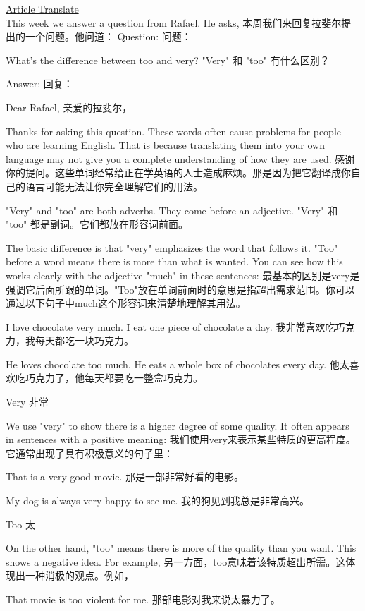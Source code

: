 \href{https://www.51voa.com/VOA_Special_English/very-and-too-84302_1.html}{Article Translate} \\

This week we answer a question from Rafael.  He asks,
本周我们来回复拉斐尔提出的一个问题。他问道：
Question:
问题：

What's the difference between too and very?
"Very" 和 "too" 有什么区别？

Answer:
回复：

Dear Rafael,
亲爱的拉斐尔，

Thanks for asking this question. These words often cause problems for people who are learning English. That is because translating them into your own language may not give you a complete understanding of how they are used.
感谢你的提问。这些单词经常给正在学英语的人士造成麻烦。那是因为把它翻译成你自己的语言可能无法让你完全理解它们的用法。

"Very" and "too" are both adverbs. They come before an adjective.
"Very" 和 "too" 都是副词。它们都放在形容词前面。

The basic difference is that "very" emphasizes the word that follows it. "Too" before a word means there is more than what is wanted. You can see how this works clearly with the adjective "much" in these sentences:
最基本的区别是very是强调它后面所跟的单词。"Too"放在单词前面时的意思是指超出需求范围。你可以通过以下句子中much这个形容词来清楚地理解其用法。

I love chocolate very much. I eat one piece of chocolate a day.
我非常喜欢吃巧克力，我每天都吃一块巧克力。

He loves chocolate too much. He eats a whole box of chocolates every day.
他太喜欢吃巧克力了，他每天都要吃一整盒巧克力。

Very
非常

We use "very" to show there is a higher degree of some quality. It often appears in sentences with a positive meaning:
我们使用very来表示某些特质的更高程度。它通常出现了具有积极意义的句子里：

That is a very good movie.
那是一部非常好看的电影。

My dog is always very happy to see me.
我的狗见到我总是非常高兴。

Too
太

On the other hand, "too" means there is more of the quality than you want. This shows a negative idea. For example,
另一方面，too意味着该特质超出所需。这体现出一种消极的观点。例如，

That movie is too violent for me.
那部电影对我来说太暴力了。


